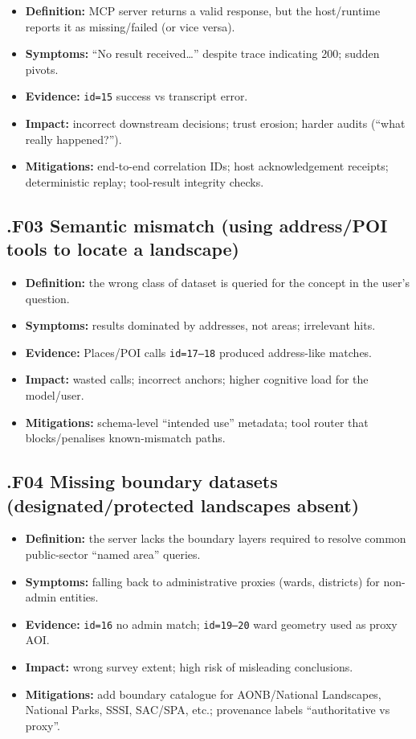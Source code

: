 \begin{itemize}[leftmargin=*]
\item \textbf{Definition:} MCP server returns a valid response, but the host/runtime reports it as missing/failed (or vice versa).
\item \textbf{Symptoms:} “No result received…” despite trace indicating 200; sudden pivots.
\item \textbf{Evidence:} \texttt{id=15} success vs transcript error.
\item \textbf{Impact:} incorrect downstream decisions; trust erosion; harder audits (“what really happened?”).
\item \textbf{Mitigations:} end-to-end correlation IDs; host acknowledgement receipts; deterministic replay; tool-result integrity checks.
\end{itemize}

\subsection*{.F03 Semantic mismatch (using address/POI tools to locate a landscape)}

\begin{itemize}[leftmargin=*]
\item \textbf{Definition:} the wrong class of dataset is queried for the concept in the user’s question.
\item \textbf{Symptoms:} results dominated by addresses, not areas; irrelevant hits.
\item \textbf{Evidence:} Places/POI calls \texttt{id=17–18} produced address-like matches.
\item \textbf{Impact:} wasted calls; incorrect anchors; higher cognitive load for the model/user.
\item \textbf{Mitigations:} schema-level “intended use” metadata; tool router that blocks/penalises known-mismatch paths.
\end{itemize}

\subsection*{.F04 Missing boundary datasets (designated/protected landscapes absent)}

\begin{itemize}[leftmargin=*]
\item \textbf{Definition:} the server lacks the boundary layers required to resolve common public-sector “named area” queries.
\item \textbf{Symptoms:} falling back to administrative proxies (wards, districts) for non-admin entities.
\item \textbf{Evidence:} \texttt{id=16} no admin match; \texttt{id=19–20} ward geometry used as proxy AOI.
\item \textbf{Impact:} wrong survey extent; high risk of misleading conclusions.
\item \textbf{Mitigations:} add boundary catalogue for AONB/National Landscapes, National Parks, SSSI, SAC/SPA, etc.; provenance labels “authoritative vs proxy”.
\end{itemize}

